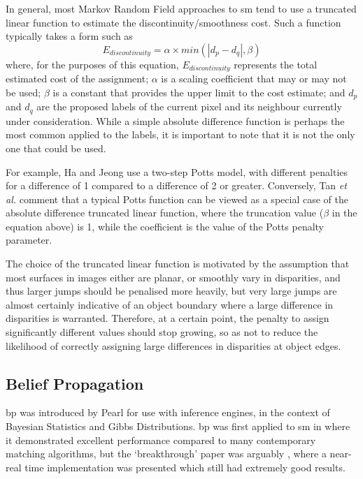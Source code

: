 In general, most Markov Random Field approaches to \gls{sm} tend to use a truncated linear function to estimate the discontinuity/smoothness cost.  Such a function typically takes a form such as \[ E_{discontinuity} = \alpha \times min(| d_p - d_q |, \beta) \] where, for the purposes of this equation, \(E_{discontinuity}\) represents the total estimated cost of the assignment; \(\alpha\) is a scaling coefficient that may or may not be used; \(\beta\) is a constant that provides the upper limit to the cost estimate; and \(d_p\) and \(d_q\) are the proposed labels of the current pixel and its neighbour currently under consideration.  While a simple absolute difference function is perhaps the most common applied to the labels, it is important to note that it is not the only one that could be used.  

For example, Ha and Jeong \cite{Ha2016} use a two-step Potts model, with different penalties for a difference of 1 compared to a difference of 2 or greater. Conversely, Tan \textit{et al.} \cite{Tan2017} comment that a typical Potts function can be viewed as a special case of the absolute difference truncated linear function, where the truncation value (\(\beta\) in the equation above) is 1, while the coefficient is the value of the Potts penalty parameter.

The choice of the truncated linear function is motivated by the assumption that most surfaces in images either are planar, or smoothly vary in disparities, and thus larger jumps should be penalised more heavily, but very large jumps are almost certainly indicative of an object boundary where a large difference in disparities is warranted.  Therefore, at a certain point, the penalty to assign significantly different values should stop growing, so as not to reduce the likelihood of correctly assigning large differences in disparities at object edges.

\subsection{Belief Propagation}
\gls{bp} was introduced by Pearl \cite{Pearl1982} for use with inference engines, in the context of Bayesian Statistics and Gibbs Distributions.  \gls{bp} was first applied to \gls{sm} in \cite{Sun2003} where it demonstrated excellent performance compared to many contemporary matching algorithms, but the `breakthrough' paper was arguably \cite{Felzenszwalb2006}, where a near-real time implementation was presented which still had extremely good results.

